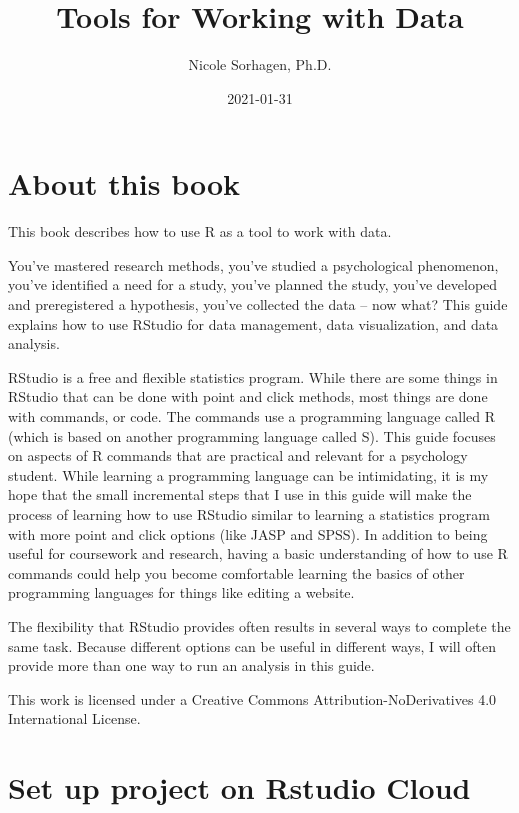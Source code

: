 \documentclass[
]{book}
\title{Tools for Working with Data}
\author{Nicole Sorhagen, Ph.D.}
\date{2021-01-31}
\begin{document}
\maketitle

{
\setcounter{tocdepth}{1}
\tableofcontents
}
\hypertarget{about-this-book}{%
\chapter{About this book}\label{about-this-book}}

This book describes how to use R as a tool to work with data.

You've mastered research methods, you've studied a psychological phenomenon, you've identified a need for a study, you've planned the study, you've developed and preregistered a hypothesis, you've collected the data -- now what? This guide explains how to use RStudio for data management, data visualization, and data analysis.

RStudio is a free and flexible statistics program. While there are some things in RStudio that can be done with point and click methods, most things are done with commands, or code. The commands use a programming language called R (which is based on another programming language called S). This guide focuses on aspects of R commands that are practical and relevant for a psychology student. While learning a programming language can be intimidating, it is my hope that the small incremental steps that I use in this guide will make the process of learning how to use RStudio similar to learning a statistics program with more point and click options (like JASP and SPSS). In addition to being useful for coursework and research, having a basic understanding of how to use R commands could help you become comfortable learning the basics of other programming languages for things like editing a website.

The flexibility that RStudio provides often results in several ways to complete the same task. Because different options can be useful in different ways, I will often provide more than one way to run an analysis in this guide.

This work is licensed under a Creative Commons Attribution-NoDerivatives 4.0 International License.

\hypertarget{set-up-project-on-rstudio-cloud}{%
\chapter{Set up project on Rstudio Cloud}\label{set-up-project-on-rstudio-cloud}}
\end{document}
